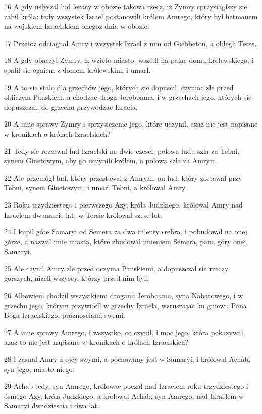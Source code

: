 \par 16 A gdy uslyszal lud lezacy w obozie takowa rzecz, iz Zymry sprzysiaglszy sie zabil króla: tedy wszystek Izrael postanowili królem Amrego, który byl hetmanem na wojskiem Izraelskiem onegoz dnia w obozie.
\par 17 Przetoz odciagnal Amry i wszystek Izrael z nim od Giebbeton, a oblegli Terse.
\par 18 A gdy obaczyl Zymry, iz wzieto miasto, wszedl na palac domu królewskiego, i spalil sie ogniem z domem królewskim, i umarl.
\par 19 A to sie stalo dla grzechów jego, których sie dopuscil, czyniac zle przed obliczem Panskiem, a chodzac droga Jeroboama, i w grzechach jego, których sie dopuszczal, do grzechu przywodzac Izraela.
\par 20 A inne sprawy Zymry i sprzysiezenie jego, które uczynil, azaz nie jest napisane w kronikach o królach Izraelskich?
\par 21 Tedy sie rozerwal lud Izraelski na dwie czesci; polowa ludu szla za Tebni, synem Ginetowym, aby go uczynili królem, a polowa szla za Amrym.
\par 22 Ale przemógl lud, który przestawal z Amrym, on lud, który zostawal przy Tebni, synem Ginetowym; i umarl Tebni, a królowal Amry.
\par 23 Roku trzydziestego i pierwszego Azy, króla Judzkiego, królowal Amry nad Izraelem dwanascie lat; w Tersie królowal szesc lat.
\par 24 I kupil góre Samaryi od Semera za dwa talenty srebra, i pobudowal na onej górze, a nazwal imie miasta, które zbudowal imieniem Semera, pana góry onej, Samaryi.
\par 25 Ale czynil Amry zle przed oczyma Panskiemi, a dopuszczal sie rzeczy gorszych, nizeli wszyscy, którzy przed nim byli.
\par 26 Albowiem chodzil wszystkiemi drogami Jeroboama, syna Nabatowego, i w grzechu jego, którym przywiódl w grzechy Izraela, wzruszajac ku gniewu Pana Boga Izraelskiego, próznosciami swemi.
\par 27 A inne sprawy Amrego, i wszystko, co czynil, i moc jego, która pokazywal, azaz to nie jest napisane w kronikach o królach Izraelskich?
\par 28 I zasnal Amry z ojcy swymi, a pochowany jest w Samaryi; i królowal Achab, syn jego, miasto niego.
\par 29 Achab tedy, syn Amrego, królowac poczal nad Izraelem roku trzydziestego i ósmego Azy, króla Judzkiego, a królowal Achab, syn Amrego, nad Izraelem w Samaryi dwadziescia i dwa lat.
